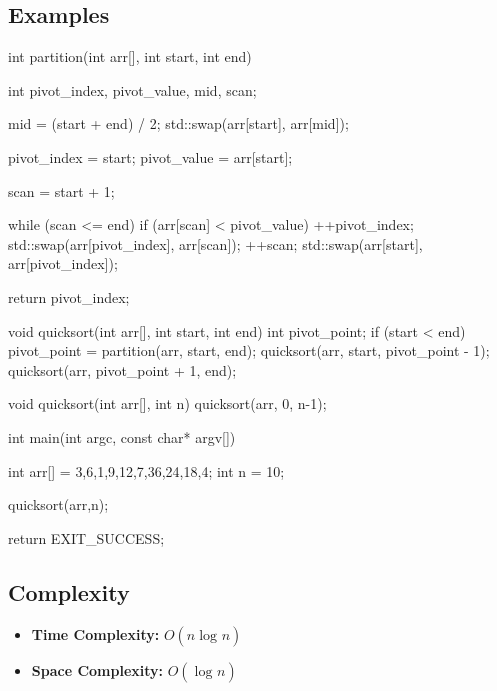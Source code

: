 \documentclass{report}
\begin{document}
    \pagebreak 
    \subsection{Examples}
    \bigbreak \noindent 
    \begin{cppcode}
int partition(int arr[], int start, int end) {
    int pivot_index, pivot_value, mid, scan;

    mid = (start + end) / 2;
    std::swap(arr[start], arr[mid]);

    pivot_index = start;
    pivot_value = arr[start];

    scan = start + 1;

    while (scan <= end) {
        if (arr[scan] < pivot_value) {
            ++pivot_index;
            std::swap(arr[pivot_index], arr[scan]);
        }
        ++scan;
    }
    std::swap(arr[start], arr[pivot_index]);

    return pivot_index;
}

void quicksort(int arr[], int start, int end) {
    int pivot_point;
    if (start < end) {
        pivot_point = partition(arr, start, end);
        quicksort(arr, start, pivot_point - 1);
        quicksort(arr, pivot_point + 1, end);
    }
}

void quicksort(int arr[], int n) {
    quicksort(arr, 0, n-1);
}

int main(int argc, const char* argv[]) {

    int arr[]  = {3,6,1,9,12,7,36,24,18,4};
    int n = 10;

    quicksort(arr,n);

    return EXIT_SUCCESS;
}
    \end{cppcode}

    \pagebreak 
    \subsection{Complexity}
    \bigbreak \noindent 
    \begin{itemize}
        \item \textbf{Time Complexity:} $O(n \log_{}{n})$
        \item \textbf{Space Complexity:} $O(\log_{}{n})$
    \end{itemize}
\end{document}
